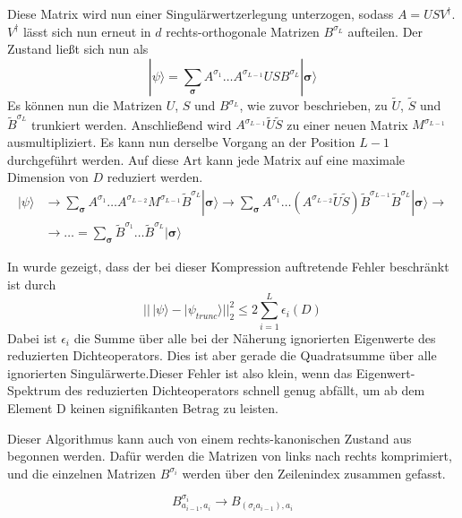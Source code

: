 \documentclass[10pt,a4paper]{report}
\begin{document}
Diese Matrix wird nun einer Singulärwertzerlegung unterzogen, sodass $A=USV^\dagger$. $V^\dagger$ lässt sich nun erneut in $d$ rechts-orthogonale Matrizen $B^{\sigma_L}$ aufteilen. Der Zustand ließt sich nun als
\begin{equation}
|\psi\rangle=\sum_{\bm{\sigma}}A^{\sigma_1}\ldots A^{\sigma_{L-1}}USB^{\sigma_L}|\bm{\sigma}\rangle
\end{equation}
Es können nun die Matrizen $U$, $S$ und $B^{\sigma_L}$, wie zuvor beschrieben, zu $\tilde{U}$, $\tilde{S}$ und $\tilde{B}^{\sigma_L}$ trunkiert werden. Anschließend wird $A^{\sigma_{L-1}}\tilde{U}\tilde{S}$ zu einer neuen Matrix $M^{\sigma_{L-1}}$ ausmultipliziert. Es kann nun derselbe Vorgang an der Position $L-1$ durchgeführt werden. Auf diese Art kann jede  Matrix auf eine maximale Dimension von $D$ reduziert werden.
\begin{equation}
\begin{split}
|\psi\rangle&\rightarrow \sum_{\bm{\sigma}}A^{\sigma_1}\ldots A^{\sigma_{L-2}}M^{\sigma_{L-1}}\tilde{B}^{\sigma_L}|\bm{\sigma}\rangle\rightarrow \sum_{\bm{\sigma}}A^{\sigma_1}\ldots (A^{\sigma_{L-2}}\tilde{U}\tilde{S})\tilde{B}^{\sigma_{L-1}}\tilde{B}^{\sigma_L}|\bm{\sigma}\rangle\rightarrow\\
&\rightarrow \ldots=\sum_{\bm{\sigma}}\tilde{B}^{\sigma_1}\ldots \tilde{B}^{\sigma_{L}}|\bm{\sigma}\rangle
\end{split}
\end{equation}

In \cite{MPS_error} wurde gezeigt, dass der bei dieser Kompression auftretende Fehler beschränkt ist durch
\begin{equation}
||\,|\psi\rangle-|\psi_{trunc}\rangle||_2^2\leq 2\sum_{i=1}^{L}\epsilon_i(D)
\end{equation}
Dabei ist $\epsilon_i$ die Summe über alle bei der Näherung ignorierten Eigenwerte des reduzierten Dichteoperators. Dies ist aber gerade die Quadratsumme über alle ignorierten Singulärwerte.Dieser Fehler ist also klein, wenn das Eigenwert-Spektrum des reduzierten Dichteoperators schnell genug abfällt, um ab dem Element D keinen signifikanten Betrag zu leisten. 

Dieser Algorithmus kann auch von einem rechts-kanonischen Zustand aus begonnen werden. Dafür werden die Matrizen von links nach rechts komprimiert, und die einzelnen Matrizen $B^{\sigma_i}$ werden über den Zeilenindex zusammen gefasst.

\begin{equation}
B_{a_{i-1},a_{i}}^{\sigma_i}\rightarrow B_{(\sigma_i a_{i-1}),a_i}
\end{equation}
\end{document}
